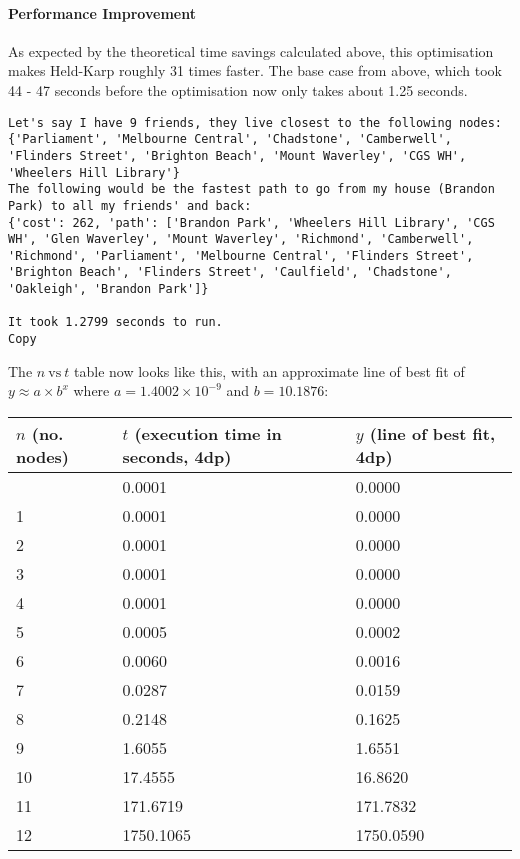 \documentclass[
]{article}
\begin{document}
\hypertarget{performance-improvement}{%
\paragraph{Performance Improvement}\label{performance-improvement}}

As expected by the theoretical time savings calculated above, this
optimisation makes Held-Karp roughly 31 times faster. The base case from
above, which took 44 - 47 seconds before the optimisation now only takes
about 1.25 seconds.

\begin{verbatim}
Let's say I have 9 friends, they live closest to the following nodes: {'Parliament', 'Melbourne Central', 'Chadstone', 'Camberwell', 'Flinders Street', 'Brighton Beach', 'Mount Waverley', 'CGS WH', 'Wheelers Hill Library'}
The following would be the fastest path to go from my house (Brandon Park) to all my friends' and back:
{'cost': 262, 'path': ['Brandon Park', 'Wheelers Hill Library', 'CGS WH', 'Glen Waverley', 'Mount Waverley', 'Richmond', 'Camberwell', 'Richmond', 'Parliament', 'Melbourne Central', 'Flinders Street', 'Brighton Beach', 'Flinders Street', 'Caulfield', 'Chadstone', 'Oakleigh', 'Brandon Park']}

It took 1.2799 seconds to run.
Copy
\end{verbatim}

The {\(n\ \text{vs}\ t\)} table now looks like this, with an approximate
line of best fit of {\(y \approx a \times b^{x}\)} where
{\(a = 1.4002 \times 10^{- 9}\)} and {\(b = 10.1876\)}:

\begin{longtable}[]{@{}lll@{}}
\toprule\noalign{}
{\(n\)} (no. nodes) & {\(t\)} (execution time in seconds, 4dp) & {\(y\)}
(line of best fit, 4dp) \\
\midrule\noalign{}
\endhead
\bottomrule\noalign{}
\endlastfoot
0 & 0.0001 & 0.0000 \\
1 & 0.0001 & 0.0000 \\
2 & 0.0001 & 0.0000 \\
3 & 0.0001 & 0.0000 \\
4 & 0.0001 & 0.0000 \\
5 & 0.0005 & 0.0002 \\
6 & 0.0060 & 0.0016 \\
7 & 0.0287 & 0.0159 \\
8 & 0.2148 & 0.1625 \\
9 & 1.6055 & 1.6551 \\
10 & 17.4555 & 16.8620 \\
11 & 171.6719 & 171.7832 \\
12 & 1750.1065 & 1750.0590 \\
\end{longtable}
\end{document}
